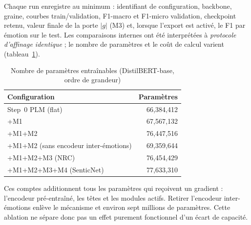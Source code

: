 Chaque run enregistre au minimum : identifiant de configuration,
backbone, graine, courbes train/validation, F1-macro et F1-micro
validation, checkpoint retenu, valeur finale de la porte $|g|$ (M3) et,
lorsque l'export est activé, le F1 par émotion sur le test. Les
comparaisons internes ont été interprétées à \emph{protocole d'affinage
identique} ; le nombre de paramètres et le coût de calcul varient
(tableau~\ref{tab:expe-param-count}).

\begin{table}[H]
\centering
\caption{Nombre de paramètres entraînables (DistilBERT-base, ordre de grandeur)}
\label{tab:expe-param-count}
\small
\renewcommand{\arraystretch}{1.15}
\begin{tabular}{|p{7.2cm}|r|}
\hline
\textbf{Configuration} & \textbf{Paramètres} \\
\hline
Step~0 PLM (flat) & 66{,}384{,}412 \\
\hline
+M1 & 67{,}567{,}132 \\
\hline
+M1+M2 & 76{,}447{,}516 \\
\hline
+M1+M2 (sans encodeur inter-émotions) & 69{,}359{,}644 \\
\hline
+M1+M2+M3 (NRC) & 76{,}454{,}429 \\
\hline
+M1+M2+M3+M4 (SenticNet) & 77{,}633{,}310 \\
\hline
\end{tabular}
\end{table}

Ces comptes additionnent tous les paramètres qui reçoivent un gradient :
l'encodeur pré-entraîné, les têtes et les modules actifs. Retirer
l'encodeur inter-émotions enlève le mécanisme et environ sept millions
de paramètres. Cette ablation ne sépare donc pas un effet purement
fonctionnel d'un écart de capacité.

